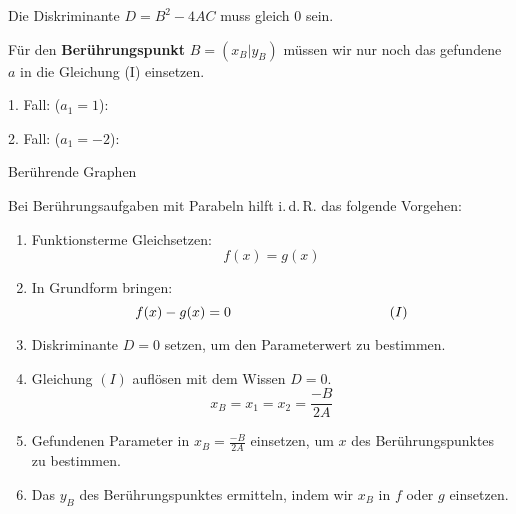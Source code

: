 Die Diskriminante $D=B^2 - 4AC$ muss gleich 0 sein. 

\newpage

Für den \textbf{Berührungspunkt} $B=(x_B|y_B)$ müssen wir nur noch das gefundene
$a$ in die Gleichung (I) einsetzen.





1. Fall: ($a_1=1$):




2. Fall: ($a_1=-2$):


\newpage




\begin{rezept}{Berührende Graphen}{}

  Bei Berührungsaufgaben mit Parabeln hilft i.\,d.\,R. das folgende
  Vorgehen:

  \begin{enumerate}
  \item Funktionsterme Gleichsetzen: $$f(x) = g(x)$$
  \item In Grundform bringen: $$f(x) - g(x) = 0  \hspace{40mm}
    (I)$$
  \item Diskriminante $D = 0 $ setzen, um den Parameterwert zu
    bestimmen.
  \item Gleichung $(I)$ auflösen mit dem Wissen $D=0$.
    $$x_B=x_1=x_2= \frac{-B}{2A}$$

  \item Gefundenen Parameter in $x_B=\frac{-B}{2A}$ einsetzen, um $x$
    des Berührungspunktes zu bestimmen.
  \item Das $y_B$ des Berührungspunktes ermitteln, indem wir $x_B$ in
    $f$ oder $g$ einsetzen.
    \end{enumerate}
\end{rezept}


